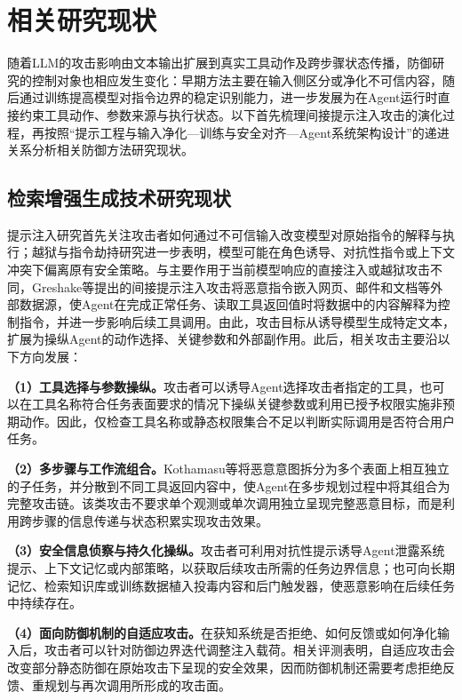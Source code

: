 ﻿\section{相关研究现状}

随着LLM的攻击影响由文本输出扩展到真实工具动作及跨步骤状态传播，防御研究的控制对象也相应发生变化：早期方法主要在输入侧区分或净化不可信内容，随后通过训练提高模型对指令边界的稳定识别能力，进一步发展为在Agent运行时直接约束工具动作、参数来源与执行状态。以下首先梳理间接提示注入攻击的演化过程，再按照“提示工程与输入净化—训练与安全对齐—Agent系统架构设计”的递进关系分析相关防御方法研究现状。

\subsection{检索增强生成技术研究现状}

提示注入研究首先关注攻击者如何通过不可信输入改变模型对原始指令的解释与执行\cite{liu2024formalizing}；越狱与指令劫持研究进一步表明，模型可能在角色诱导、对抗性指令或上下文冲突下偏离原有安全策略\cite{shen2024do,zeng2024howjohnny2}。与主要作用于当前模型响应的直接注入或越狱攻击不同，Greshake等\cite{greshake2023notwhat}提出的间接提示注入攻击将恶意指令嵌入网页、邮件和文档等外部数据源，使Agent在完成正常任务、读取工具返回值时将数据中的内容解释为控制指令，并进一步影响后续工具调用。由此，攻击目标从诱导模型生成特定文本，扩展为操纵Agent的动作选择、关键参数和外部副作用。此后，相关攻击主要沿以下方向发展：

\textbf{（1）工具选择与参数操纵。}攻击者可以诱导Agent选择攻击者指定的工具\cite{shi2026pitoolselection}，也可以在工具名称符合任务表面要求的情况下操纵关键参数或利用已授予权限实施非预期动作\cite{zhang2026evaluatingprivilege}。因此，仅检查工具名称或静态权限集合不足以判断实际调用是否符合用户任务。

\textbf{（2）多步骤与工作流组合。}Kothamasu等\cite{kothamasu2026hidden}将恶意意图拆分为多个表面上相互独立的子任务，并分散到不同工具返回内容中，使Agent在多步规划过程中将其组合为完整攻击链。该类攻击不要求单个观测或单次调用独立呈现完整恶意目标，而是利用跨步骤的信息传递与状态积累实现攻击效果。

\textbf{（3）安全信息侦察与持久化操纵。}攻击者可利用对抗性提示诱导Agent泄露系统提示、上下文记忆或内部策略，以获取后续攻击所需的任务边界信息\cite{hui2024scp}；也可向长期记忆、检索知识库或训练数据植入投毒内容和后门触发器，使恶意影响在后续任务中持续存在\cite{chen2024agentpoison,bi2024backdoor}。

\textbf{（4）面向防御机制的自适应攻击。}在获知系统是否拒绝、如何反馈或如何净化输入后，攻击者可以针对防御边界迭代调整注入载荷。相关评测表明，自适应攻击会改变部分静态防御在原始攻击下呈现的安全效果\cite{zhan2025adaptive}，因而防御机制还需要考虑拒绝反馈、重规划与再次调用所形成的攻击面。


